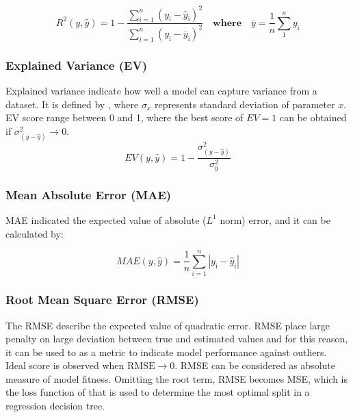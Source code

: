 \begin{equation}\label{eqn:rsquared}
    R^2(y,\hat{y}) = 1 - \frac{\sum_{i = 1}^{n} (y_{\text{i}} - \hat{y}_{\text{i}} )^2 }{\sum_{i = 1}^{n} (y_{\text{i}} - \overline{y}_{\text{i}})^2} \quad \textbf{where} \quad \overline{y} = \frac{1}{n}\sum_{1}^{n} y_\text{i}
\end{equation}

\subsubsection*{Explained Variance (EV)}\label{sec:expVar}

Explained variance indicate how well a model can capture variance from a dataset. It is defined by , where $\sigma_x$ represents standard deviation of parameter $x$. EV score range between 0 and 1, where the best score of $EV = 1$ can be obtained if $\sigma^2_{(y-\hat{y})} \rightarrow 0$.\\  

\begin{equation}\label{eqn:expVar}
    EV(y,\hat{y}) = 1 - \frac{\sigma^2_{(y-\hat{y})}}{\sigma^2_{y}}
\end{equation}

\subsubsection*{Mean Absolute Error (MAE)}\label{sec:MAE}

MAE indicated the expected value of absolute ($L^1$ norm) error, and it can be calculated by:

\begin{equation}\label{eqn:MAE}
    MAE(y,\hat{y}) = \frac{1}{n}\sum_{i=1}^{n} |y_{\text{i}} - \hat{y}_{\text{i}}| 
\end{equation}

\subsubsection*{Root Mean Square Error (RMSE)}\label{sec:RMSE}

The RMSE describe the expected value of quadratic error. RMSE place large penalty on large deviation between true and estimated values and for this reason, it can be used to as a metric to indicate model performance against outliers. Ideal score is observed when $\text{RMSE} \rightarrow 0$. RMSE can be considered as absolute measure of model fitness. Omitting the root term, RMSE becomes MSE, which is the loss function of  that is used to determine the most optimal split in a regression decision tree.\\

